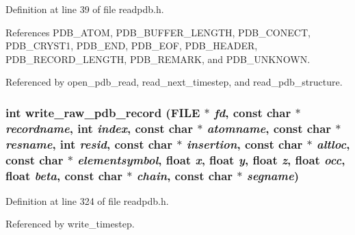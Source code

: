 Definition at line 39 of file readpdb.h.

References PDB\_\-ATOM, PDB\_\-BUFFER\_\-LENGTH, PDB\_\-CONECT, PDB\_\-CRYST1, PDB\_\-END, PDB\_\-EOF, PDB\_\-HEADER, PDB\_\-RECORD\_\-LENGTH, PDB\_\-REMARK, and PDB\_\-UNKNOWN.

Referenced by open\_\-pdb\_\-read, read\_\-next\_\-timestep, and read\_\-pdb\_\-structure.
\subsubsection{\setlength{\rightskip}{0pt plus 5cm}int write\_\-raw\_\-pdb\_\-record (FILE $\ast$ {\em fd}, const char $\ast$ {\em recordname}, int {\em index}, const char $\ast$ {\em atomname}, const char $\ast$ {\em resname}, int {\em resid}, const char $\ast$ {\em insertion}, const char $\ast$ {\em altloc}, const char $\ast$ {\em elementsymbol}, float {\em x}, float {\em y}, float {\em z}, float {\em occ}, float {\em beta}, const char $\ast$ {\em chain}, const char $\ast$ {\em segname})\hspace{0.3cm}{\tt  [static]}}\label{readpdb_8h_a18}




Definition at line 324 of file readpdb.h.

Referenced by write\_\-timestep.